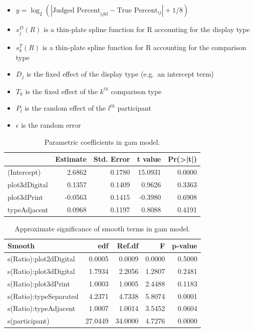 \documentclass[letterpaper,inpress,dvipsnames]{jdsart}
\begin{document}
\begin{itemize}
\item
  \(y=\log_2(|\text{Judged Percent}_{ijkl} - \text{True Percent}_{ij}|+1/8)\)
\item
  \(s^D_j(R)\) is a thin-plate spline function for R accounting for the display type
\item
  \(s^T_k(R)\) is a thin-plate spline function for R accounting for the comparison type
\item
  \(D_j\) is the fixed effect of the display type (e.g.~an intercept term)
\item
  \(T_k\) is the fixed effect of the \(k^{th}\) comparison type
\item
  \(P_l\) is the random effect of the \(l^{th}\) participant
\item
  \(\epsilon\) is the random error
\end{itemize}

\begin{table}

\caption{\label{tab:gam-param}Parametric coefficients in gam model.}
\centering
\begin{tabular}[t]{lrrrr}
\toprule
  & Estimate & Std. Error & t value & Pr(>|t|)\\
\midrule
(Intercept) & 2.6862 & 0.1780 & 15.0931 & 0.0000\\
plot3dDigital & 0.1357 & 0.1409 & 0.9626 & 0.3363\\
plot3dPrint & -0.0563 & 0.1415 & -0.3980 & 0.6908\\
typeAdjacent & 0.0968 & 0.1197 & 0.8088 & 0.4191\\
\bottomrule
\end{tabular}
\end{table}

\begin{table}

\caption{\label{tab:gam-smooth}Approximate significance of smooth terms in gam model.}
\centering
\begin{tabular}[t]{lrrrr}
\toprule
Smooth & edf & Ref.df & F & p-value\\
\midrule
s(Ratio):plot2dDigital & 0.0005 & 0.0009 & 0.0000 & 0.5000\\
s(Ratio):plot3dDigital & 1.7934 & 2.2056 & 1.2807 & 0.2481\\
s(Ratio):plot3dPrint & 1.0003 & 1.0005 & 2.4488 & 0.1183\\
s(Ratio):typeSeparated & 4.2371 & 4.7338 & 5.8074 & 0.0001\\
s(Ratio):typeAdjacent & 1.0007 & 1.0014 & 3.5452 & 0.0604\\
\addlinespace
s(participant) & 27.0449 & 34.0000 & 4.7276 & 0.0000\\
\bottomrule
\end{tabular}
\end{table}
\end{document}
